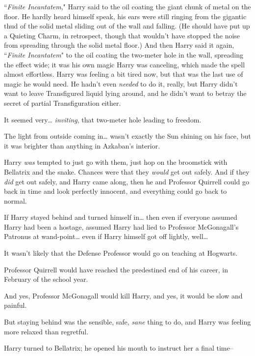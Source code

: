 \later

``\emph{Finite Incantatem}," Harry said to the oil coating the giant chunk of metal on the floor. He hardly heard himself speak, his ears were still ringing from the gigantic thud of the solid metal sliding out of the wall and falling. (He should have put up a Quieting Charm, in retrospect, though that wouldn't have stopped the noise from spreading through the solid metal floor.) And then Harry said it again, ``\emph{Finite Incantatem}" to the oil coating the two-meter hole in the wall, spreading the effect wide; it was his own magic Harry was canceling, which made the spell almost effortless. Harry was feeling a bit tired now, but that was the last use of magic he would need. He hadn't even \emph{needed} to do it, really, but Harry didn't want to leave Transfigured liquid lying around, and he didn't want to betray the secret of partial Transfiguration either.

It seemed very{\ldots} \emph{inviting}, that two-meter hole leading to freedom.

The light from outside coming in{\ldots} wasn't exactly the Sun shining on his face, but it was brighter than anything in Azkaban's interior.

Harry \emph{was} tempted to just go with them, just hop on the broomstick with Bellatrix and the snake. Chances were that they \emph{would} get out safely. And if they \emph{did} get out safely, and Harry came along, then he and Professor Quirrell could go back in time and look perfectly innocent, and everything could go back to normal.

If Harry stayed behind and turned himself in{\ldots} then even if everyone assumed Harry had been a hostage, assumed Harry had lied to Professor McGonagall's Patronus at wand-point{\ldots} even if Harry himself got off lightly, well{\ldots}

It wasn't likely that the Defense Professor would go on teaching at Hogwarts.

Professor Quirrell would have reached the predestined end of his career, in February of the school year.

And yes, Professor McGonagall would kill Harry, and yes, it would be slow and painful.

But staying behind was the sensible, safe, \emph{sane} thing to do, and Harry was feeling more relaxed than regretful.

Harry turned to Bellatrix; he opened his mouth to instruct her a final time\---

